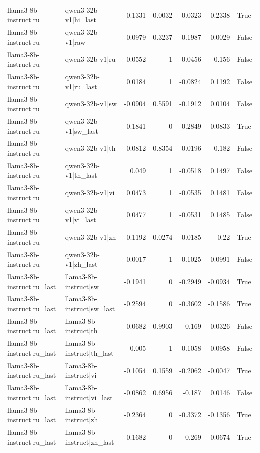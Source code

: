 \begin{table}
\begin{tabular}{l l r r r r l}
llama3-8b-instruct|ru & qwen3-32b-v1|hi_last & 0.1331 & 0.0032 & 0.0323 & 0.2338 & True \\
llama3-8b-instruct|ru & qwen3-32b-v1|raw & -0.0979 & 0.3237 & -0.1987 & 0.0029 & False \\
llama3-8b-instruct|ru & qwen3-32b-v1|ru & 0.0552 & 1 & -0.0456 & 0.156 & False \\
llama3-8b-instruct|ru & qwen3-32b-v1|ru_last & 0.0184 & 1 & -0.0824 & 0.1192 & False \\
llama3-8b-instruct|ru & qwen3-32b-v1|sw & -0.0904 & 0.5591 & -0.1912 & 0.0104 & False \\
llama3-8b-instruct|ru & qwen3-32b-v1|sw_last & -0.1841 & 0 & -0.2849 & -0.0833 & True \\
llama3-8b-instruct|ru & qwen3-32b-v1|th & 0.0812 & 0.8354 & -0.0196 & 0.182 & False \\
llama3-8b-instruct|ru & qwen3-32b-v1|th_last & 0.049 & 1 & -0.0518 & 0.1497 & False \\
llama3-8b-instruct|ru & qwen3-32b-v1|vi & 0.0473 & 1 & -0.0535 & 0.1481 & False \\
llama3-8b-instruct|ru & qwen3-32b-v1|vi_last & 0.0477 & 1 & -0.0531 & 0.1485 & False \\
llama3-8b-instruct|ru & qwen3-32b-v1|zh & 0.1192 & 0.0274 & 0.0185 & 0.22 & True \\
llama3-8b-instruct|ru & qwen3-32b-v1|zh_last & -0.0017 & 1 & -0.1025 & 0.0991 & False \\
llama3-8b-instruct|ru_last & llama3-8b-instruct|sw & -0.1941 & 0 & -0.2949 & -0.0934 & True \\
llama3-8b-instruct|ru_last & llama3-8b-instruct|sw_last & -0.2594 & 0 & -0.3602 & -0.1586 & True \\
llama3-8b-instruct|ru_last & llama3-8b-instruct|th & -0.0682 & 0.9903 & -0.169 & 0.0326 & False \\
llama3-8b-instruct|ru_last & llama3-8b-instruct|th_last & -0.005 & 1 & -0.1058 & 0.0958 & False \\
llama3-8b-instruct|ru_last & llama3-8b-instruct|vi & -0.1054 & 0.1559 & -0.2062 & -0.0047 & True \\
llama3-8b-instruct|ru_last & llama3-8b-instruct|vi_last & -0.0862 & 0.6956 & -0.187 & 0.0146 & False \\
llama3-8b-instruct|ru_last & llama3-8b-instruct|zh & -0.2364 & 0 & -0.3372 & -0.1356 & True \\
llama3-8b-instruct|ru_last & llama3-8b-instruct|zh_last & -0.1682 & 0 & -0.269 & -0.0674 & True \\

\end{tabular}
\end{table}

